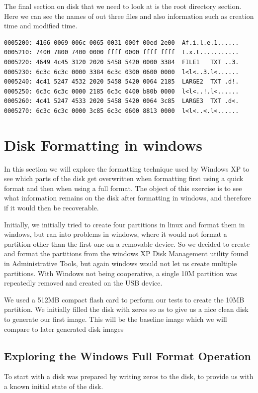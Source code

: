\documentclass[a4paper,
    11pt,
    normalheadings,
    parindent,
    UKenglish,
    abstracton,
    ]{scrartcl}
\begin{document}
The final section on disk that we need to look at is the root directory section. Here we can see the names of out three files and also information such as creation time and modified time.
\begin{verbatim}
0005200: 4166 0069 006c 0065 0031 000f 00ed 2e00  Af.i.l.e.1......
0005210: 7400 7800 7400 0000 ffff 0000 ffff ffff  t.x.t...........
0005220: 4649 4c45 3120 2020 5458 5420 0000 3384  FILE1   TXT ..3.
0005230: 6c3c 6c3c 0000 3384 6c3c 0300 0600 0000  l<l<..3.l<......
0005240: 4c41 5247 4532 2020 5458 5420 0064 2185  LARGE2  TXT .d!.
0005250: 6c3c 6c3c 0000 2185 6c3c 0400 b80b 0000  l<l<..!.l<......
0005260: 4c41 5247 4533 2020 5458 5420 0064 3c85  LARGE3  TXT .d<.
0005270: 6c3c 6c3c 0000 3c85 6c3c 0600 8813 0000  l<l<..<.l<......
\end{verbatim}

\section{Disk Formatting in windows}

In this section we will explore the formatting technique used by Windows XP to see which parts of the disk get overwritten when formatting first using a quick format and then when using a full format. The object of this exercise is to see what information remains on the disk after formatting in windows, and therefore if it would then be recoverable.

Initially, we initially tried to create four partitions in linux and format them in windows, but ran into problems in windows, where it would not format a partition other than the first one on a removable device. So we decided to create and format the partitions from the windows XP Disk Management utility found in Administrative Tools, but again windows would not let us create multiple partitions. With Windows not being cooperative,  a single 10M partition was repeatedly removed and created on the USB device.

We used a 512MB compact flash card to perform our tests to create the 10MB partition. We initially filled the disk with zeros so as to give us a nice clean disk to generate our first image. This will be the baseline image which we will compare to later generated disk images

\subsection{Exploring the Windows Full Format Operation}
To start with a disk was prepared by writing zeros to the disk, to provide us with a known initial state of the disk.
\end{document}
